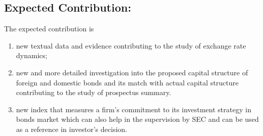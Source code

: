 \documentclass[12pt]{article} %
\begin{document}
\subsection{Expected Contribution:}
	The expected contribution is
	\begin{enumerate}
		\item new textual data and evidence contributing to the study of exchange rate dynamics;
		\item new and more detailed investigation into the proposed capital structure of foreign and domestic bonds and its match with actual capital structure contributing to the study of prospectus summary. %
		\item new index that measures a firm's commitment to its investment strategy in bonds market which can also help in the supervision by SEC and can be used as a reference in investor's decision.
	\end{enumerate}
	
	
\footnotesize


\end{document}
